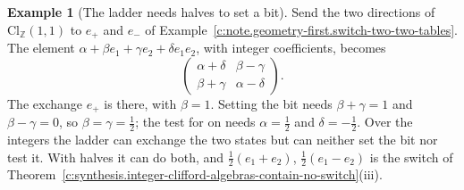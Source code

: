 \documentclass[11pt]{article}
\theoremstyle{definition}
\newtheorem{example}[theorem]{Example}
\theoremstyle{plain}
\providecommand{\Cl}{}\renewcommand{\Cl}{\mathrm{Cl}}
\providecommand{\Z}{}\renewcommand{\Z}{\mathbb{Z}}
\begin{document}
\begin{example}[The ladder needs halves to set a bit]\label{c:note.geometry-first.ladder-needs-halves-set-bit}
Send the two directions of $\Cl_{\Z}(1,1)$ to $e_{+}$ and $e_{-}$ of Example~\ref{c:note.geometry-first.switch-two-two-tables}. The element $\alpha + \beta e_{1} + \gamma e_{2} + \delta e_{1}e_{2}$, with integer coefficients, becomes
\[
\begin{pmatrix} \alpha + \delta & \beta - \gamma \\ \beta + \gamma & \alpha - \delta \end{pmatrix} .
\]
The exchange $e_{+}$ is there, with $\beta = 1$. Setting the bit needs $\beta + \gamma = 1$ and $\beta - \gamma = 0$, so $\beta = \gamma = \tfrac12$; the test for on needs $\alpha = \tfrac12$ and $\delta = -\tfrac12$. Over the integers the ladder can exchange the two states but can neither set the bit nor test it. With halves it can do both, and $\tfrac12(e_{1} + e_{2})$, $\tfrac12(e_{1} - e_{2})$ is the switch of Theorem~\ref{c:synthesis.integer-clifford-algebras-contain-no-switch}(iii).
\end{example}
\end{document}
